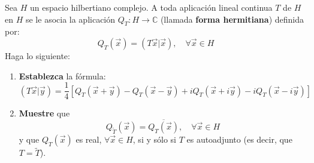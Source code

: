 \documentclass[12pt]{report}
\newcounter{it}
\theoremstyle{largebreak}
\newcommand\cf[3]{\ensuremath{#1:#2\rightarrow#3}}
\newcommand\adj[1]{\ensuremath{\widetilde{#1}}}
\newcommand\pint[2]{\ensuremath{\left(#1\big|#2\right)}}
\newcommand\conj[1]{\ensuremath{\overline{#1}}}
\begin{document}
    \begin{excer}
        Sea $H$ un espacio hilbertiano complejo. A toda aplicación lineal continua $T$ de $H$ en $H$ se le asocia la aplicación $\cf{Q_T}{H}{\mathbb{C}}$ (llamada \textbf{forma hermitiana}) definida por:
        \begin{equation*}
            Q_T(\vec{x})=\pint{T\vec{x}}{\vec{x}},\quad\forall\vec{x}\in H
        \end{equation*}
        Haga lo siguiente:
        \begin{enumerate}
            \item \textbf{Establezca} la fórmula:
            \begin{equation*}
                \pint{T\vec{x}}{\vec{y}}=\frac{1}{4}\left[Q_T(\vec{x}+\vec{y})-Q_T(\vec{x}-\vec{y})+iQ_T(\vec{x}+i\vec{y})-iQ_T(\vec{x}-i\vec{y})\right]
            \end{equation*}
            \item \textbf{Muestre} que
            \begin{equation*}
                Q_{\adj{T}}(\vec{x})=\conj{Q_T(\vec{x})},\quad\forall\vec{x}\in H
            \end{equation*}
            y que $Q_T(\vec{x})$ es real, $\forall\vec{x}\in H$, si y sólo si $T$ es autoadjunto (es decir, que $T=\adj{T}$).
        \end{enumerate}
    \end{excer}
\end{document}

